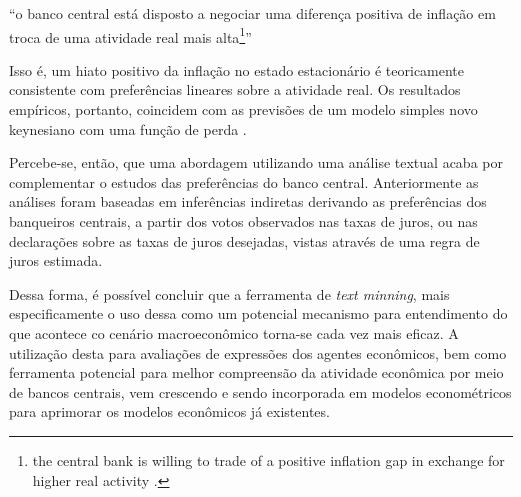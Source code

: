\begin{enumerate}
\begin{citacao}
    ``o banco central está disposto a negociar uma diferença positiva de inflação em troca de uma atividade real mais alta\footnote{the central bank is willing to trade of a positive inflation gap in exchange for higher real activity \cite[p.4]{shapiro2019taking}.}''\cite[p.4]{shapiro2019taking}
\end{citacao}
    Isso é, um hiato positivo da inflação no estado estacionário é teoricamente consistente com preferências lineares sobre a atividade real. Os resultados empíricos, portanto, coincidem com as previsões de um modelo simples novo keynesiano com uma função de perda .
\end{enumerate}

Percebe-se, então, que uma abordagem utilizando uma análise textual acaba por complementar o estudos das preferências do banco central. Anteriormente as análises foram baseadas em inferências indiretas derivando as preferências dos banqueiros centrais, a partir dos votos observados nas taxas de juros, ou nas declarações sobre as taxas de juros desejadas, vistas através de uma regra de juros estimada. 

Dessa forma, é possível concluir que a ferramenta de \textit{text minning}, mais especificamente o uso dessa como um potencial mecanismo para entendimento do que acontece co cenário macroeconômico torna-se cada vez mais eficaz. A utilização desta para avaliações de expressões dos agentes econômicos, bem como ferramenta potencial para melhor compreensão da atividade econômica por meio de bancos centrais, vem crescendo e sendo incorporada em modelos econométricos para aprimorar os modelos econômicos já existentes.





